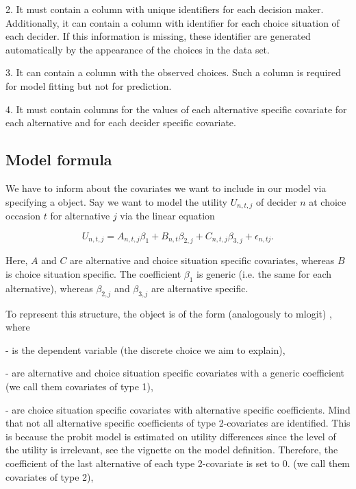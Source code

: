 \documentclass[article]{jss}
\begin{document}
2. It must contain a column with unique identifiers for each decision maker. Additionally, it can contain a column with identifier for each choice situation of each decider. If this information is missing, these identifier are generated automatically by the appearance of the choices in the data set.

3. It can contain a column with the observed choices. Such a column is required for model fitting but not for prediction.

4. It must contain columns for the values of each alternative specific covariate for each alternative and for each decider specific covariate.

\subsection{Model formula} \label{subsec:model_formula}

We have to inform  about the covariates we want to include in our model via specifying a  object. Say we want to model the utility $U_{n,t,j}$ of decider $n$ at choice occasion $t$ for alternative $j$ via the linear equation

$$U_{n,t,j} = A_{n,t,j} \beta_1 + B_{n,t} \beta_{2,j} + C_{n,t,j} \beta_{3,j} + \epsilon_{n,tj}.$$

Here, $A$ and $C$ are alternative and choice situation specific covariates, whereas $B$ is choice situation specific. The coefficient $\beta_1$ is generic (i.e. the same for each alternative), whereas $\beta_{2,j}$ and $\beta_{3,j}$ are alternative specific.

To represent this structure, the  object is of the form (analogously to {mlogit}) , where

-  is the dependent variable (the discrete choice we aim to explain),

-  are alternative and choice situation specific covariates with a generic coefficient (we call them covariates of type 1),

-  are choice situation specific covariates with alternative specific coefficients. Mind that not all alternative specific coefficients of type 2-covariates are identified. This is because the probit model is estimated on utility differences since the level of the utility is irrelevant, see the vignette on the model definition. Therefore, the coefficient of the last alternative of each type 2-covariate is set to 0. (we call them covariates of type 2),
\end{document}
